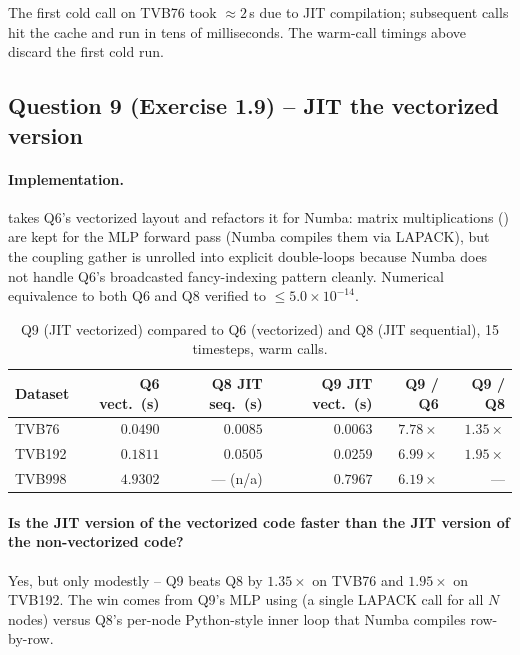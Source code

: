 \documentclass[11pt, a4paper]{article}
\begin{document}
The first cold call on TVB76 took $\approx 2$\,s due to JIT compilation;
subsequent calls hit the cache and run in tens of milliseconds. The
warm-call timings above discard the first cold run.

\subsection{Question 9 (Exercise 1.9) -- JIT the vectorized version}

\paragraph{Implementation.}
 takes Q6's vectorized layout and
refactors it for Numba: matrix multiplications () are kept for
the MLP forward pass (Numba compiles them via LAPACK), but the coupling
gather is unrolled into explicit double-loops because Numba does not
handle Q6's broadcasted fancy-indexing pattern cleanly. Numerical
equivalence to both Q6 and Q8 verified to $\leq 5.0 \times 10^{-14}$.

\begin{table}[H]
    \centering
    \caption{Q9 (JIT vectorized) compared to Q6 (vectorized) and Q8 (JIT sequential), 15 timesteps, warm calls.}
    \label{tab:q9-comparison}
    \footnotesize
    \begin{tabular}{lrrrrr}
        \toprule
        Dataset & Q6 vect.\ (s) & Q8 JIT seq.\ (s) & Q9 JIT vect.\ (s) & Q9 / Q6 & Q9 / Q8 \\
        \midrule
        TVB76   & $0.0490$ & $0.0085$  & $0.0063$ & $7.78\times$ & $1.35\times$ \\
        TVB192  & $0.1811$ & $0.0505$  & $0.0259$ & $6.99\times$ & $1.95\times$ \\
        TVB998  & $4.9302$ & --- (n/a) & $0.7967$ & $\mathbf{6.19\times}$ & --- \\
        \bottomrule
    \end{tabular}
\end{table}

\paragraph{Is the JIT version of the vectorized code faster than the JIT version of the non-vectorized code?}
Yes, but only modestly -- Q9 beats Q8 by $1.35\times$ on TVB76 and
$1.95\times$ on TVB192. The win comes from Q9's MLP using
 (a single LAPACK call for all $N$ nodes)
versus Q8's per-node Python-style inner loop that Numba compiles
row-by-row.
\end{document}
